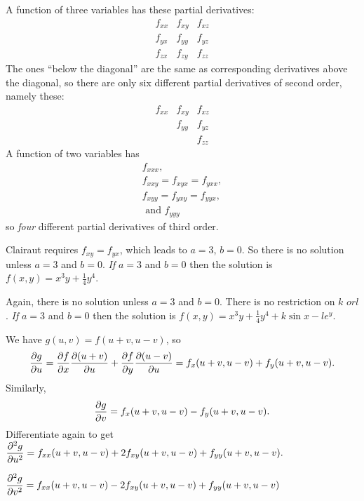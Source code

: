 A function of three variables has these partial derivatives:
\[
  \begin{matrix}
    f_{xx} & f_{xy} & f_{xz} \\
    f_{yx} & f_{yy} & f_{yz} \\
    f_{zx} & f_{zy} & f_{zz}
  \end{matrix}
\]
The ones ``below the diagonal'' are the same as corresponding derivatives
above the diagonal, so there are only six different partial derivatives
of second order, namely these:
\[
  \begin{matrix}
    f_{xx} & f_{xy} & f_{xz} \\
    & f_{yy} & f_{yz} \\
    & & f_{zz}
  \end{matrix}
\]
A function of two variables has
\begin{gather*}
  f_{xxx}, \\
  f_{xxy}=f_{xyx}=f_{yxx}, \\
  f_{xyy}=f_{yxy}=f_{yyx},\\
  \text{ and } f_{yyy}
\end{gather*}
so \emph{four} different partial derivatives of third order.
\bigskip

\item[{\bfseries(IV15.14a)}]

Clairaut requires $f_{xy} = f_{yx}$, which leads to $a=3$, $b=0$.  So there is no solution unless $a=3$ and $b=0$.  \emph{If} $a=3$ and $b=0$ then the solution is $f(x,y) = x^3y + \frac14 y^4 $.
\bigskip

\item[{\bfseries(IV15.14b)}]

Again, there is no solution unless $a=3$ and $b=0$.  There is no restriction on $k$ $or l$.  \emph{If} $a=3$ and $b=0$ then the solution is $f(x,y) = x^3y + \frac14 y^4 + k\sin x - le^y$.
\bigskip

\item[{\bfseries(IV15.15a)}]

We have $g(u,v) = f(u+v, u-v)$, so
\[
  \frac{\partial g}{\partial u} = \frac{\partial f}{\partial x} \frac{\partial (u+v)}{\partial u} + \frac{\partial f}{\partial y} \frac{\partial (u-v)}{\partial u}
  = f_x(u+v, u-v)+f_y(u+v, u-v).
\]
Similarly,
\[
  \frac{\partial g}{\partial v} = f_x(u+v, u-v) - f_y(u+v, u-v).
\]
Differentiate again to get
\(\displaystyle
  \frac{\partial^2 g}{\partial u^2}
  = f_{xx}(u+v, u-v)+2f_{xy}(u+v, u-v)+f_{yy}(u+v, u-v).
\)
\bigskip

\item[{\bfseries(IV15.15b)}]

\(\displaystyle
\frac{\partial^2 g}{\partial v^2}
= f_{xx}(u+v, u-v)-2f_{xy}(u+v, u-v)+f_{yy}(u+v, u-v)
\)

